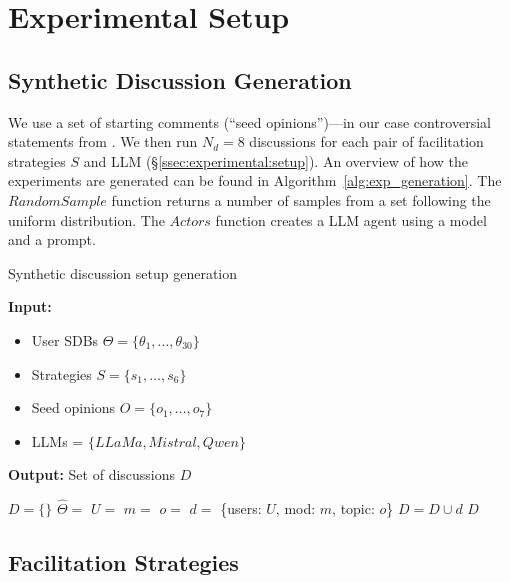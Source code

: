 \section{Experimental Setup}
\label{sec:experimental}

\subsection{Synthetic Discussion Generation}
\label{ssec:appendix:discussion}

We use a set of starting comments (``seed opinions'')---in our case controversial statements from \citet{pavlopoulos-likas-2024-polarized}. We then run $N_d=8$ discussions for each pair of facilitation strategies $S$ and LLM (\S\ref{ssec:experimental:setup}). An overview of how the experiments are generated can be found in Algorithm~\ref{alg:exp_generation}.  The $RandomSample$ function returns a number of samples from a set following the uniform distribution. The $Actors$ function creates a LLM agent using a model and a prompt.

\begin{algorithm}[t]
	\caption{Synthetic discussion setup generation}
	\label{alg:exp_generation}
	\hspace*{\algorithmicindent} \textbf{Input:} 
	\begin{itemize}[noitemsep, nosep]
		\item User SDBs $\Theta = \{\theta_1, \dots, \theta_{30}\}$
		\item Strategies $S = \{s_1, \ldots, s_6\}$
		\item Seed opinions $O = \{o_1, \ldots, o_7\}$
		\item LLMs = $\{LLaMa, Mistral, Qwen\}$
	\end{itemize}
	\hspace*{\algorithmicindent} \textbf{Output:} Set of discussions $D$
	\begin{algorithmic}[1]
		\State $D = \{\}$
		\State $\hat{\Theta} = $ 
		\State $U =$  
		\State $m = $ 
		\State $o = $ 
		\State $d =$ \{users: $U$, mod: $m$, topic: $o$\}
		\State $D = D \cup d$
		\EndFor
		\EndFor
		\EndFor
		\State \Return $D$
	\end{algorithmic}
\end{algorithm}


\subsection{Facilitation Strategies}
\label{ssec:experimental:strategies}

